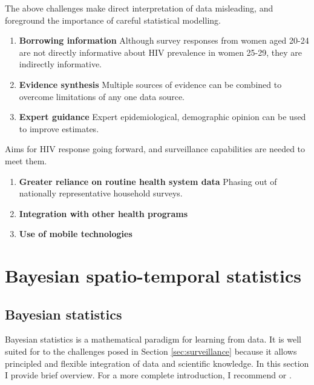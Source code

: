 \documentclass[a4paper, nobind]{templates/ociamthesis}
\providecommand{\tightlist}{%
  \setlength{\itemsep}{0pt}\setlength{\parskip}{0pt}}
\begin{document}
The above challenges make direct interpretation of data misleading, and foreground the importance of careful statistical modelling.

\begin{enumerate}
\def\labelenumi{\arabic{enumi}.}
\tightlist
\item
  \textbf{Borrowing information}
  Although survey responses from women aged 20-24 are not directly informative about HIV prevalence in women 25-29, they are indirectly informative.
\item
  \textbf{Evidence synthesis}
  Multiple sources of evidence can be combined to overcome limitations of any one data source.
\item
  \textbf{Expert guidance}
  Expert epidemiological, demographic opinion can be used to improve estimates.
\end{enumerate}

Aims for HIV response going forward, and surveillance capabilities are needed to meet them.

\begin{enumerate}
\def\labelenumi{\arabic{enumi}.}
\tightlist
\item
  \textbf{Greater reliance on routine health system data} Phasing out of nationally representative household surveys.
\item
  \textbf{Integration with other health programs}
\item
  \textbf{Use of mobile technologies}
\end{enumerate}

\hypertarget{bayes-st}{%
\chapter{Bayesian spatio-temporal statistics}\label{bayes-st}}

\adjustmtc
{}

\hypertarget{bayesian-statistics}{%
\section{Bayesian statistics}\label{bayesian-statistics}}

Bayesian statistics is a mathematical paradigm for learning from data.
It is well suited for to the challenges posed in Section \ref{sec:surveillance} because it allows principled and flexible integration of data and scientific knowledge.
In this section I provide brief overview.
For a more complete introduction, I recommend \textcite{mcelreath2020statistical} or \textcite{gelman2013bayesian}.
\end{document}
